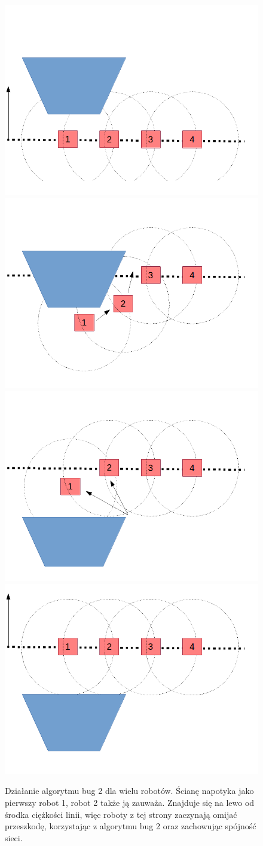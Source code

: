 \documentclass[a4paper, 12pt]{article}
\begin{document}
	\begin{figure}[h!]
		\includegraphics*[width=0.5\columnwidth]{img/przeszkoda/1.png}
		\includegraphics*[width=0.5\columnwidth]{img/przeszkoda/2.png}
		\includegraphics*[width=0.5\columnwidth]{img/przeszkoda/3.png}
		\includegraphics*[width=0.5\columnwidth]{img/przeszkoda/4.png}
		\caption{Działanie algorytmu bug 2 dla wielu robotów. Ścianę napotyka jako pierwszy robot 1, robot 2 także ją zauważa. Znajduje się na lewo od środka ciężkości linii, więc roboty z tej strony zaczynają omijać przeszkodę, korzystając z algorytmu bug 2 oraz zachowując spójność sieci.}
		\label{omijanie}
	\end{figure}
	\clearpage
\end{document}
